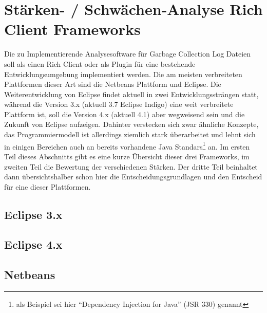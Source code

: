 \chapter{Stärken- / Schwächen-Analyse Rich Client Frameworks}
Die zu Implementierende Analysesoftware für Garbage Collection Log Dateien soll als einen Rich Client oder als Plugin für eine bestehende Entwicklungsumgebung implementiert werden. Die am meisten verbreiteten Plattformen dieser Art sind die Netbeans Plattform und Eclipse. Die Weiterentwicklung von Eclipse findet aktuell in zwei Entwicklungssträngen statt, während die Version 3.x (aktuell 3.7 Eclipse Indigo) eine weit verbreitete Plattform ist, soll die Version 4.x (aktuell 4.1) aber wegweisend sein und die Zukunft von Eclipse aufzeigen. Dahinter verstecken sich zwar ähnliche Konzepte, das Programmiermodell ist allerdings ziemlich stark überarbeitet und lehnt sich in einigen Bereichen auch an bereits vorhandene Java Standars\footnote{als Beispiel sei hier ``Dependency Injection for Java'' (JSR 330) genannt} an. Im ersten Teil dieses Abschnitts gibt es eine kurze Übersicht dieser drei Frameworks, im zweiten Teil die Bewertung der verschiedenen Stärken. Der dritte Teil beinhaltet dann übersichtshalber schon hier die Entscheidungsgrundlagen und den Entscheid für eine dieser Plattformen. 

\section{Eclipse 3.x}




\section{Eclipse 4.x}




\section{Netbeans}







